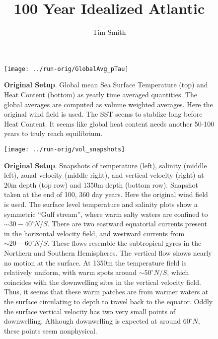 \documentclass[a4paper,11pt]{article}
\title{\vspace{-10ex}100 Year Idealized Atlantic}
\author{Tim Smith}
\date{\vspace{-5ex}}
\begin{document}
 
\maketitle



\begin{figure}[h]
\centering
\texttt{[image: ../run-orig/GlobalAvg\_pTau]}
\caption{\textbf{Original Setup}. Global mean Sea Surface Temperature (top) and Heat Content (bottom) as yearly time averaged quantities. The global averages are computed as volume weighted averages. Here the original wind field is used. The SST seems to stablize long before Heat Content. It seems like global heat content needs another 50-100 years to truly reach equilibrium. }
\label{fig:globalAvgs}
\end{figure}

\begin{figure}
\centering
\texttt{[image: ../run-orig/vol\_snapshots]}
\caption{\textbf{Original Setup}. Snapshots of temperature (left), salinity (middle left), zonal velocity (middle right), and vertical velocity (right) at 20m depth (top row) and 1350m depth (bottom row). Snapshot taken at the end of 100, 360 day years. Here the original wind field is used. The surface level temperature and salinity plots show a symmetric ``Gulf stream'', where warm salty waters are confined to $\sim 30-40^{\circ}N/S$. There are two eastward equatorial currents present in the horizontal velocity field, and westward currents from $\sim20-60^{\circ}N/S$. These flows resemble the subtropical gyres in the Northern and Southern Hemispheres. The vertical flow shows nearly no motion at the surface. At 1350m the temperature field is relatively uniform, with warm spots around $\sim50^{\circ}N/S$, which coincides with the downwelling sites in the vertical velocity field. Thus, it seems that these warm patches are from warmer waters at the surface circulating to depth to travel back to the equator. Oddly the surface vertical velocity has two very small points of downwelling. Although downwelling is expected at around $60^{\circ}N$, these points seem nonphysical.}
\label{fig:volSnaps}
\end{figure}
\end{document}
